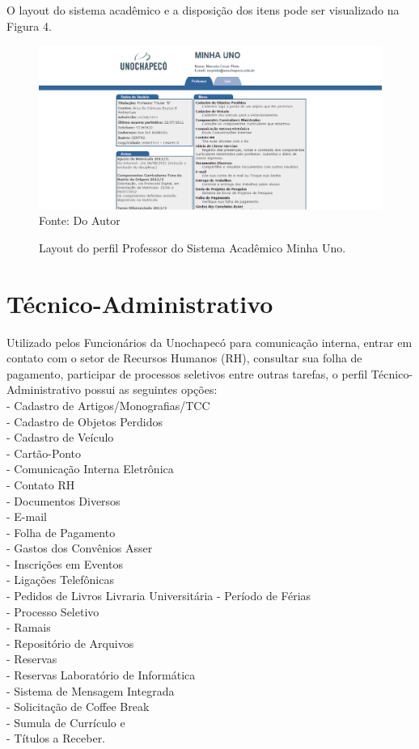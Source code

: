 O layout do sistema acadêmico e a disposição dos itens pode ser visualizado na Figura 4.


\begin{figure}[!htb]
     \centering
     \caption[Layout do Sistema - Perfil Professor]{Layout do perfil Professor do Sistema Acadêmico Minha Uno.}
     \includegraphics[scale=0.4]{imagens/professor.png}
     \\ Fonte: Do Autor
\end{figure}

\newpage

\section{Técnico-Administrativo}
Utilizado pelos Funcionários da Unochapecó para comunicação interna, entrar em contato com o setor de Recursos Humanos (RH),
consultar sua folha de pagamento, participar de processos seletivos entre outras tarefas, o perfil Técnico-Administrativo
possui as seguintes opções: \\
- Cadastro de Artigos/Monografias/TCC \\
- Cadastro de Objetos Perdidos \\
- Cadastro de Veículo \\
- Cartão-Ponto \\
- Comunicação Interna Eletrônica \\
- Contato RH \\
- Documentos Diversos \\
- E-mail \\
- Folha de Pagamento \\
- Gastos dos Convênios Asser \\
- Inscrições em Eventos \\
- Ligações Telefônicas \\
- Pedidos de Livros Livraria Universitária
- Período de Férias \\
- Processo Seletivo \\
- Ramais \\
- Repositório de Arquivos \\
- Reservas \\
- Reservas Laboratório de Informática \\
- Sistema de Mensagem Integrada \\
- Solicitação de Coffee Break \\
- Sumula de Currículo e \\
- Títulos a Receber. \\

